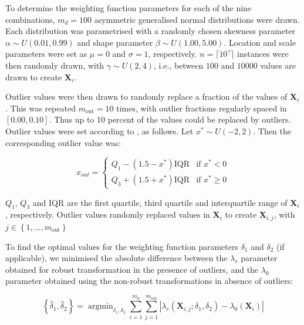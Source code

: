 \documentclass[preprint,12pt,authoryear]{elsarticle}
\DeclareMathOperator*{\argmin}{argmin}
\begin{document}
To determine the weighting function parameters for each of the nine
combinations, \(m_d=100\) asymmetric generalised normal distributions
were drawn. Each distribution was parametrised with a randomly chosen
skewness parameter \(\alpha \sim U\left(0.01, 0.99\right)\) and shape
parameter \(\beta \sim U\left(1.00, 5.00 \right)\). Location and scale
parameters were set as \(\mu = 0\) and \(\sigma = 1\), respectively.
\(n = \lceil 10^\gamma \rceil\) instances were then randomly drawn, with
\(\gamma \sim U\left(2, 4\right)\), i.e., between \(100\) and \(10000\)
values are drawn to create \(\mathbf{X}_i\).

Outlier values were then drawn to randomly replace a fraction of the
values of \(\mathbf{X}_i\). This was repeated \(m_{\text{out}} = 10\)
times, with outlier fractions regularly spaced in \([0.00, 0.10]\). Thus
up to 10 percent of the values could be replaced by outliers. Outlier
values were set according to \citet{Tukey1977-xm}, as follows. Let
\(x^{*} \sim U\left(-2, 2\right)\). Then the corresponding outlier value
was:

\begin{equation}
x_{out} =
\begin{cases}
Q_1 - \left(1.5 - x^{*} \right) \text{IQR} & \text{if } x^{*} < 0 \\
Q_3 + \left(1.5 + x^{*} \right) \text{IQR} & \text{if } x^{*} \geq 0
\end{cases}
\end{equation}

\(Q_1\), \(Q_3\) and \(\text{IQR}\) are the first quartile, third
quartile and interquartile range of \(\mathbf{X}_i\), respectively.
Outlier values randomly replaced values in \(\mathbf{X}_i\) to create
\(\mathbf{X}_{i,j}\), with
\(j \in \left\{ 1, \ldots, m_{\text{out}} \right\}\)

To find the optimal values for the weighting function parameters
\(\delta_1\) and \(\delta_2\) (if applicable), we minimised the absolute
difference between the \(\lambda_{r}\) parameter obtained for robust
transformation in the presence of outliers, and the \(\lambda_0\)
parameter obtained using the non-robust transformations in absence of
outliers:

\begin{equation}
\label{eqn:minimisation-weighting}
\left\{ \hat{\delta}_1, \hat{\delta}_2 \right\} = \argmin_{\delta_1, \delta_2} \sum_{i=1}^{m_d} \sum_{j=1}^{m_{\text{out}}} \left| \lambda_r \left(\mathbf{X}_{i, j}; \delta_1, \delta_2 \right) - \lambda_0 \left(\mathbf{X}_i \right) \right|
\end{equation}
\end{document}
